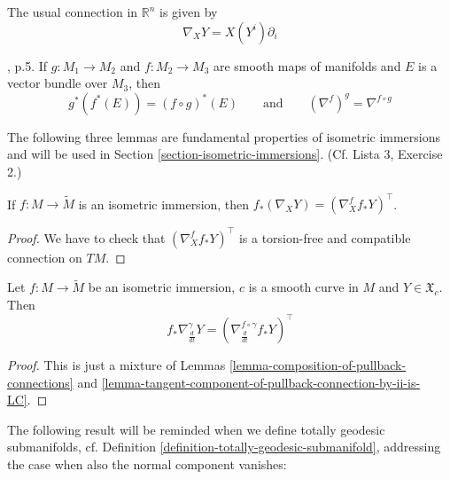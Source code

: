 \begin{example}
\label{example-euclidean-connection}
The usual connection in $\mathbb{R}^n$ is given by 
$$
\nabla_XY=X(Y^i)\partial_i
$$
\end{example}

\begin{proposition}
\label{proposition-existence-of-pullback-connection}
\end{proposition}

\begin{lemma}
\label{lemma-composition-of-pullback-connections}
\cite{aulas}, p.5. If $g:M_1\to M_2$ and $f:M_2\to M_3$ are smooth maps of 
manifolds and $E$ is a vector bundle over $M_3$, then
$$
g^* (f^* (E))=(f\circ g)^* (E)\qquad \text{and}\qquad
(\nabla^f)^g=\nabla^{f\circ g}
$$
\end{lemma}

The following three lemmas are fundamental properties of isometric
immersions and will be used in Section \ref{section-isometric-immersions}. (Cf.
Lista 3, Exercise 2.)

\begin{lemma}
\label{lemma-tangent-component-of-pullback-connection-by-ii-is-LC}
If $f:M \to \tilde{M}$ is an isometric immersion, then 
$f_*(\nabla_XY)=(\nabla^f_Xf_*Y)^\top$.
\end{lemma}

\begin{proof}
We have to check that $(\nabla^f_Xf_*Y)^\top$ is a torsion-free and compatible
connection on $TM$.
\end{proof}

\begin{lemma}
\label{lemma-isometric-immersion-along-curve}
Let $f:M \to \tilde{M}$ be an isometric immersion, $c$ is a smooth curve in $M$
and $Y\in\mathfrak{X}_c$. Then
$$
f_*\nabla_{\frac{d}{dt}}^\gamma Y
=\left(\nabla^{f\circ\gamma}_{\frac{d}{dt}}f_*Y\right)^\top
$$
\end{lemma}

\begin{proof}
This is just a mixture of Lemmas \ref{lemma-composition-of-pullback-connections}
 and \ref{lemma-tangent-component-of-pullback-connection-by-ii-is-LC}.
\end{proof}

The following result will be reminded when we define totally geodesic
submanifolds, cf. Definition \ref{definition-totally-geodesic-submanifold},
addressing the case when also the normal component vanishes:

